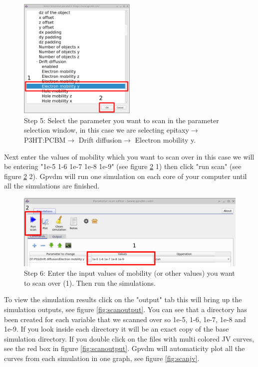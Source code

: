 \begin{figure}[H]
\centering
\includegraphics[width=0.5\textwidth]{./images/param_scan_select.png}
\caption{Step 5: Select the parameter you want to scan in the parameter selection window, in this case we are selecting epitaxy$\rightarrow$ P3HT:PCBM$\rightarrow$ Drift diffusion$\rightarrow$ Electron mobility y.}
\label{fig:scanselect}
\end{figure}

Next enter the values of mobility which you want to scan over in this case we will be entering "1e-5 1-6 1e-7 1e-8 1e-9" (see figure \ref{fig:runscan} 1) then click "run scan" (see figure \ref{fig:runscan} 2). Gpvdm will run one simulation on each core of your computer until all the simulations are finished.

\begin{figure}[H]
\centering
\includegraphics[width=\textwidth]{./images/param_scan_inputvalues.png}
\caption{Step 6: Enter the input values of mobility (or other values) you want to scan over (1). Then run the simulations.}
\label{fig:runscan}
\end{figure}

To view the simulation results click on the "output" tab this will bring up the simulation outputs, see figure \ref{fig:scanoutput}. You can see that a directory has been created for each variable that we scanned over so 1e-5, 1-6, 1e-7, 1e-8 and 1e-9.  If you look inside each directory it will be an exact copy of the base simulation directory.  If you double click on the files with multi colored JV curves, see the red box in figure \ref{fig:scanoutput}. Gpvdm will automaticity plot all the curves from each simulation in one graph, see figure \ref{fig:scanjv}.

